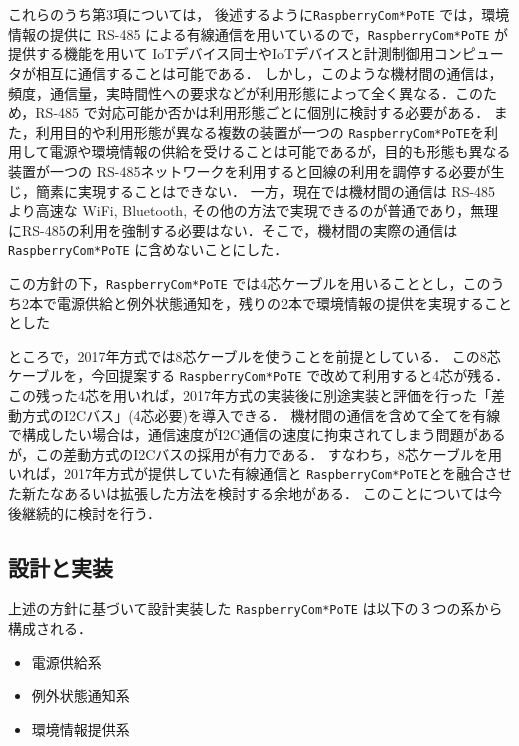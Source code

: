 
これらのうち第3項については，
後述するように{\tt Raspberry\-Com*PoTE} では，環境情報の提供に RS-485 による有線通信を用いているので，{\tt Raspberry\-Com*PoTE} が提供する機能を用いて IoTデバイス同士やIoTデバイスと計測制御用コンピュータが相互に通信することは可能である．
しかし，このような機材間の通信は，頻度，通信量，実時間性への要求などが利用形態によって全く異なる．このため，RS-485 で対応可能か否かは利用形態ごとに個別に検討する必要がある．
また，利用目的や利用形態が異なる複数の装置が一つの {\tt Raspberry\-Com*PoTE}を利用して電源や環境情報の供給を受けることは可能であるが，目的も形態も異なる装置が一つの RS-485ネットワークを利用すると回線の利用を調停する必要が生じ，簡素に実現することはできない．
一方，現在では機材間の通信は RS-485 より高速な WiFi, Bluetooth, その他の方法で実現できるのが普通であり，無理にRS-485の利用を強制する必要はない．そこで，機材間の実際の通信は {\tt Raspberry\-Com*PoTE} に含めないことにした．

この方針の下，{\tt Raspberry\-Com*PoTE} では4芯ケーブルを用いることとし，このうち2本で電源供給と例外状態通知を，残りの2本で環境情報の提供を実現することとした

ところで，2017年方式では8芯ケーブルを使うことを前提としている．
この8芯ケーブルを，今回提案する {\tt Raspberry\-Com*PoTE} で改めて利用すると4芯が残る．
この残った4芯を用いれば，2017年方式の実装後に別途実装と評価を行った「差動方式のI2Cバス」(4芯必要)を導入できる．
機材間の通信を含めて全てを有線で構成したい場合は，通信速度がI2C通信の速度に拘束されてしまう問題があるが，この差動方式のI2Cバスの採用が有力である．
すなわち，8芯ケーブルを用いれば，2017年方式が提供していた有線通信と {\tt Raspberry\-Com*PoTE}とを融合させた新たなあるいは拡張した方法を検討する余地がある．
このことについては今後継続的に検討を行う．



\subsection{設計と実装}

上述の方針に基づいて設計実装した {\tt Raspberry\-Com*PoTE} は以下の３つの系から構成される．

\begin{itemize}
\item 電源供給系
\item 例外状態通知系
\item 環境情報提供系
\end{itemize}


